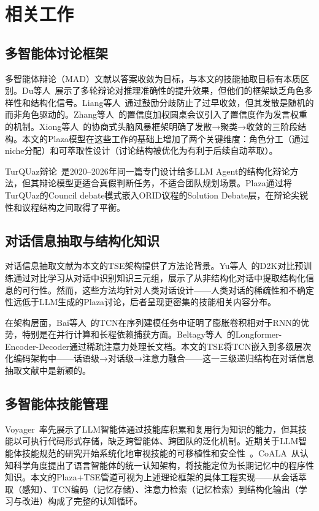 \documentclass[conference]{IEEEtran}
\begin{document}
\section{相关工作}

\subsection{多智能体讨论框架}

多智能体辩论（MAD）文献以答案收敛为目标，与本文的技能抽取目标有本质区别。Du等人~\cite{du2023improving}展示了多轮辩论对推理准确性的提升效果，但他们的框架缺乏角色多样性和结构化信号。Liang等人~\cite{liang2023encouraging}通过鼓励分歧防止了过早收敛，但其发散是随机的而非角色驱动的。Zhang等人~\cite{zhang2024reconcile}的置信度加权圆桌会议引入了置信度作为发言权重的机制。Xiong等人~\cite{xiong2023dubi}的协商式头脑风暴框架明确了发散→聚类→收敛的三阶段结构。本文的Plaza模型在这些工作的基础上增加了两个关键维度：角色分工（通过niche分配）和可萃取性设计（讨论结构被优化为有利于后续自动萃取）。

TurQUaz辩论~\cite{gungor2025turquaz}是2020--2026年间一篇专门设计给多LLM Agent的结构化辩论方法，但其辩论模型更适合真假判断任务，不适合团队规划场景。Plaza通过将TurQUaz的Council debate模式嵌入ORID议程的Solution Debate层，在辩论尖锐性和议程结构之间取得了平衡。

\subsection{对话信息抽取与结构化知识}

对话信息抽取文献为本文的TSE架构提供了方法论背景。Yu等人~\cite{yu2022d2k}的D2K对比预训练通过对比学习从对话中识别知识三元组，展示了从非结构化对话中提取结构化信息的可行性。然而，这些方法均针对人类对话设计——人类对话的稀疏性和不确定性远低于LLM生成的Plaza讨论，后者呈现更密集的技能相关内容分布。

在架构层面，Bai等人~\cite{bai2018tcn}的TCN在序列建模任务中证明了膨胀卷积相对于RNN的优势，特别是在并行计算和长程依赖捕获方面。Beltagy等人~\cite{beltagy2020longformer}的Longformer-Encoder-Decoder通过稀疏注意力处理长文档。本文的TSE将TCN嵌入到多级层次化编码架构中——话语级→对话级→注意力融合——这一三级递归结构在对话信息抽取文献中是新颖的。

\subsection{多智能体技能管理}

Voyager~\cite{wang2023voyager}率先展示了LLM智能体通过技能库积累和复用行为知识的能力，但其技能以可执行代码形式存储，缺乏跨智能体、跨团队的泛化机制。近期关于LLM智能体技能规范的研究开始系统化地审视技能的可移植性和安全性~\cite{skill_pseudocode2025,skill_comprehension2025}。CoALA~\cite{sumers2023coala}从认知科学角度提出了语言智能体的统一认知架构，将技能定位为长期记忆中的程序性知识。本文的Plaza+TSE管道可视为上述理论框架的具体工程实现——从会话萃取（感知）、TCN编码（记忆存储）、注意力检索（记忆检索）到结构化输出（学习与改进）构成了完整的认知循环。
\end{document}
